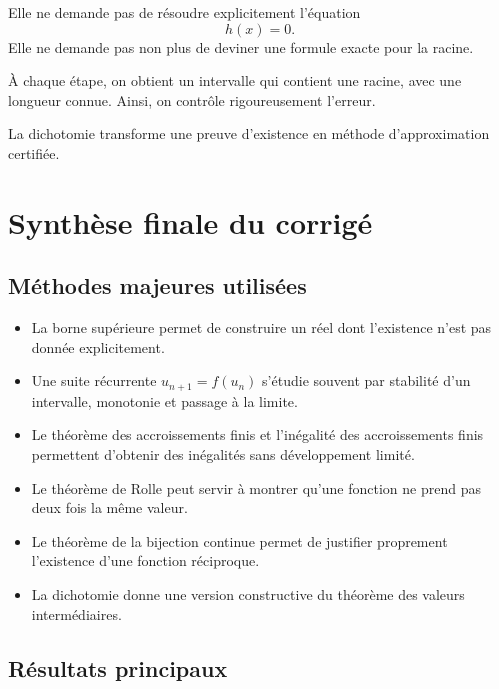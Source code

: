 \documentclass[11pt,a4paper]{article}
\begin{document}
Elle ne demande pas de résoudre explicitement l'équation
\[
h(x)=0.
\]
Elle ne demande pas non plus de deviner une formule exacte pour la racine.

À chaque étape, on obtient un intervalle qui contient une racine, avec une longueur connue. Ainsi, on contrôle rigoureusement l'erreur.

\begin{resultatbox}
La dichotomie transforme une preuve d'existence en méthode d'approximation certifiée.
\end{resultatbox}

\newpage


\section*{Synthèse finale du corrigé}

\subsection*{Méthodes majeures utilisées}

\begin{itemize}
    \item La borne supérieure permet de construire un réel dont l'existence n'est pas donnée explicitement.
    \item Une suite récurrente \(u_{n+1}=f(u_n)\) s'étudie souvent par stabilité d'un intervalle, monotonie et passage à la limite.
    \item Le théorème des accroissements finis et l'inégalité des accroissements finis permettent d'obtenir des inégalités sans développement limité.
    \item Le théorème de Rolle peut servir à montrer qu'une fonction ne prend pas deux fois la même valeur.
    \item Le théorème de la bijection continue permet de justifier proprement l'existence d'une fonction réciproque.
    \item La dichotomie donne une version constructive du théorème des valeurs intermédiaires.
\end{itemize}

\subsection*{Résultats principaux}
\end{document}
